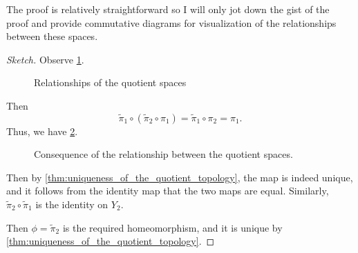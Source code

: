 \documentclass[notoc,notitlepage]{tufte-book}
\begin{document}
The proof is relatively straightforward so I will only jot down the gist of the proof and provide
commutative diagrams for visualization of the relationships between these spaces.

\begin{proof}[Sketch]
  Observe \cref{fig:relationships_of_the_quotient_spaces}.
  \begin{figure}[ht]
    \centering
    \caption{Relationships of the quotient spaces}
    \label{fig:relationships_of_the_quotient_spaces}
  \end{figure}

  Then
  \begin{equation*}
    \tilde{\pi}_1 \circ (\tilde{\pi}_2 \circ \pi_1) = \tilde{\pi}_1 \circ \pi_2 = \pi_1.
  \end{equation*}
  Thus, we have \cref{fig:consequence_of_the_relationship_between_the_quotient_spaces_}.
  \begin{figure}[ht]
    \centering
    \caption{Consequence of the relationship between the quotient spaces.}
    \label{fig:consequence_of_the_relationship_between_the_quotient_spaces_}
  \end{figure}

  Then by \cref{thm:uniqueness_of_the_quotient_topology}, the map is indeed unique, and it
  follows from the identity map that the two maps are equal. Similarly, $\tilde{\pi}_2 \circ
  \tilde{\pi}_1$ is the identity on $Y_2$.

  Then $\phi = \tilde{\pi}_2$ is the required homeomorphism, and it is unique by
  \cref{thm:uniqueness_of_the_quotient_topology}.

\end{proof}

\end{document}
